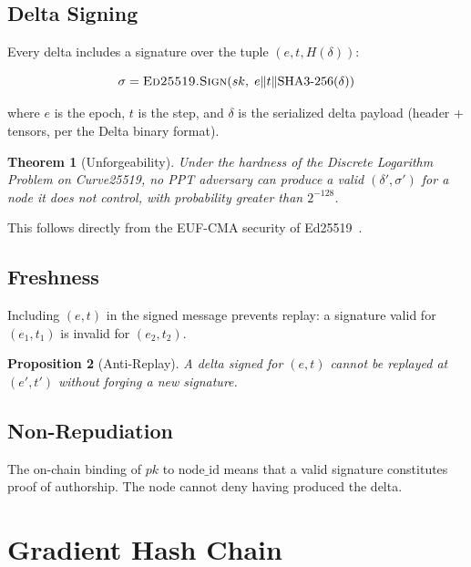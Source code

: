 \documentclass[11pt,letterpaper]{article}
\newtheorem{theorem}{Theorem}[section]
\newtheorem{proposition}[theorem]{Proposition}
\begin{document}
\subsection{Delta Signing}

Every delta includes a signature over the tuple $(e, t, H(\delta))$:

\begin{equation}
    \sigma = \textsc{Ed25519.Sign}\!\left(sk, \; e \| t \| \text{SHA3-256}(\delta)\right)
    \label{eq:delta-sig}
\end{equation}

where $e$ is the epoch, $t$ is the step, and $\delta$ is the serialized delta payload (header + tensors, per the Delta binary format).

\begin{theorem}[Unforgeability]
Under the hardness of the Discrete Logarithm Problem on Curve25519, no PPT adversary can produce a valid $(\delta', \sigma')$ for a node it does not control, with probability greater than $2^{-128}$.
\end{theorem}

This follows directly from the EUF-CMA security of Ed25519~\cite{bernstein2012ed25519}.

\subsection{Freshness}

Including $(e, t)$ in the signed message prevents replay: a signature valid for $(e_1, t_1)$ is invalid for $(e_2, t_2)$.

\begin{proposition}[Anti-Replay]
A delta signed for $(e, t)$ cannot be replayed at $(e', t')$ without forging a new signature.
\end{proposition}

\subsection{Non-Repudiation}

The on-chain binding of $pk$ to $\text{node\_id}$ means that a valid signature constitutes proof of authorship.  The node cannot deny having produced the delta.

\section{Gradient Hash Chain}
\label{sec:hashchain}
\end{document}
